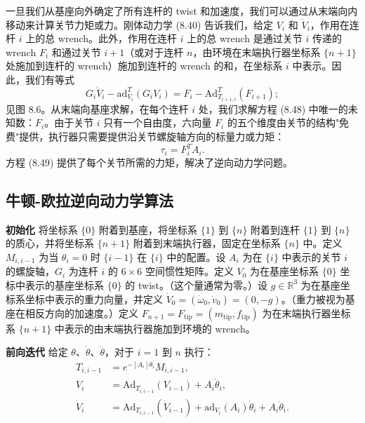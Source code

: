 \documentclass[12pt,a4paper]{article}
\begin{document}
一旦我们从基座向外确定了所有连杆的 twist 和加速度，我们可以通过从末端向内移动来计算关节力矩或力。刚体动力学 (8.40) 告诉我们，给定 $V_i$ 和 $\dot{V}_i$，作用在连杆 $i$ 上的总 wrench。此外，作用在连杆 $i$ 上的总 wrench 是通过关节 $i$ 传递的 wrench $F_i$ 和通过关节 $i+1$（或对于连杆 $n$，由环境在末端执行器坐标系 $\{n+1\}$ 处施加到连杆的 wrench）施加到连杆的 wrench 的和，在坐标系 $i$ 中表示。因此，我们有等式
\begin{equation}
G_i \dot{V}_i - \text{ad}_{V_i}^T(G_i V_i) = F_i - \text{Ad}_{T_{i+1,i}}^T(F_{i+1}); \label{eq:8.48}
\end{equation}
见图 8.6。从末端向基座求解，在每个连杆 $i$ 处，我们求解方程 (8.48) 中唯一的未知数：$F_i$。由于关节 $i$ 只有一个自由度，六向量 $F_i$ 的五个维度由关节的结构"免费"提供，执行器只需要提供沿关节螺旋轴方向的标量力或力矩：
\begin{equation}
\tau_i = F_i^T A_i. \label{eq:8.49}
\end{equation}
方程 (8.49) 提供了每个关节所需的力矩，解决了逆向动力学问题。

\subsection{牛顿-欧拉逆向动力学算法}
\textbf{初始化} 将坐标系 $\{0\}$ 附着到基座，将坐标系 $\{1\}$ 到 $\{n\}$ 附着到连杆 $\{1\}$ 到 $\{n\}$ 的质心，并将坐标系 $\{n+1\}$ 附着到末端执行器，固定在坐标系 $\{n\}$ 中。定义 $M_{i,i-1}$ 为当 $\theta_i = 0$ 时 $\{i-1\}$ 在 $\{i\}$ 中的配置。设 $A_i$ 为在 $\{i\}$ 中表示的关节 $i$ 的螺旋轴，$G_i$ 为连杆 $i$ 的 $6 \times 6$ 空间惯性矩阵。定义 $V_0$ 为在基座坐标系 $\{0\}$ 坐标中表示的基座坐标系 $\{0\}$ 的 twist。（这个量通常为零。）设 $g \in \mathbb{R}^3$ 为在基座坐标系坐标中表示的重力向量，并定义 $\dot{V}_0 = (\dot{\omega}_0, \dot{v}_0) = (0, -g)$。（重力被视为基座在相反方向的加速度。）定义 $F_{n+1} = F_{\text{tip}} = (m_{\text{tip}}, f_{\text{tip}})$ 为在末端执行器坐标系 $\{n+1\}$ 中表示的由末端执行器施加到环境的 wrench。

\textbf{前向迭代} 给定 $\theta$、$\dot{\theta}$、$\ddot{\theta}$，对于 $i = 1$ 到 $n$ 执行：
\begin{align}
T_{i,i-1} &= e^{-[A_i]\theta_i}M_{i,i-1}, \label{eq:8.50} \\
V_i &= \text{Ad}_{T_{i,i-1}}(V_{i-1}) + A_i \dot{\theta}_i, \label{eq:8.51} \\
\dot{V}_i &= \text{Ad}_{T_{i,i-1}}(\dot{V}_{i-1}) + \text{ad}_{V_i}(A_i)\dot{\theta}_i + A_i \ddot{\theta}_i. \label{eq:8.52}
\end{align}
\end{document}
